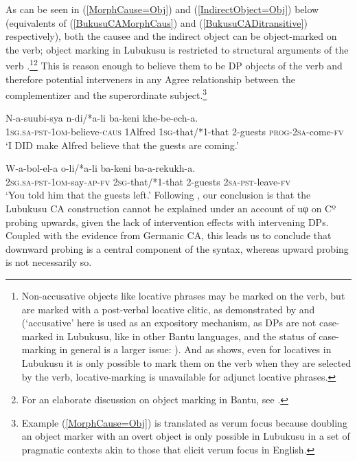 \documentclass[output=paper
,modfonts
,nonflat
]{langsci/langscibook}
\begin{document}
\z
\noindent As can be seen in (\ref{MorphCause=Obj}) and (\ref{IndirectObject=Obj}) below (equivalents of (\ref{BukusuCAMorphCaus}) and (\ref{BukusuCADitransitive}) respectively), both the causee and the indirect object can be object-marked on the verb; object marking in Lubukusu is restricted to structural arguments of the verb \citep{Diercks:2011,SikukuEt:2017}.\footnote{Non-accusative objects like locative phrases may be marked on the verb, but are marked with a post-verbal locative clitic, as demonstrated by \citet{Diercks:2010,Diercks:2011} and \citet{SikukuEt:2017} (`accusative' here is used as an expository mechanism, as DPs are not case-marked in Lubukusu, like in other Bantu languages, and the status of case-marking in general is a larger issue: \citealt{Harford:1985,Halpert:2012,Diercks:2012,vanderwal:2015}). And as \citet{Diercks:2011} shows, even for locatives in Lubukusu it is only possible to mark them on the verb when they are selected by the verb, locative-marking is unavailable for adjunct locative phrases.}\footnote{For an elaborate discussion on object marking in Bantu, see .} This is reason enough to believe them to be DP objects of the verb and therefore potential interveners in any Agree relationship between the complementizer and the superordinate subject.\footnote{Example (\ref{MorphCause=Obj}) is translated as verum focus because doubling an object marker with an overt object is only possible in Lubukusu in a set of pragmatic contexts akin to those that elicit verum focus in English.}
\newpage 

\ea \label{MorphCause=Obj}
\gll N-a-suubi-sya  n-di/*a-li ba-keni khe-be-ech-a.	\\
1\textsc{sg}.\textsc{sa}-\textsc{pst}-1\textsc{om}-believe-\textsc{caus} 1Alfred 1\textsc{sg}-that/*1-that 2-guests \textsc{prog}-2\textsc{sa}-come-\textsc{fv} \\
\glt `I DID make Alfred believe that the guests are coming.'
\z

\ea \label{IndirectObject=Obj}
\gll W-a-bol-el-a o-li/*a-li ba-keni ba-a-rekukh-a. \\
2\textsc{sg}.\textsc{sa}-\textsc{pst}-1\textsc{om}-say-\textsc{ap}-\textsc{fv} {2\textsc{sg}-that/*1-that} 2-guests 2\textsc{sa}-\textsc{pst}-leave-\textsc{fv} \\
\glt `You told him that the guests left.'
\z
\noindent Following \citet{Diercks:2013}, our conclusion is that the Lubukusu CA construction cannot be explained under an account of uφ on Cº probing upwards, given the lack of intervention effects with intervening DPs. Coupled with the evidence from Germanic CA, this leads us to conclude that downward probing is a central component of the syntax, whereas upward probing is not necessarily so.  
\end{document}

